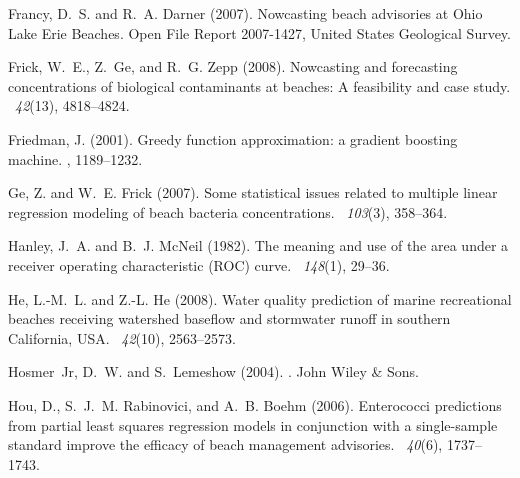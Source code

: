 \documentclass[authoryear,review, 12pt]{elsarticle}
\begin{document}
\begin{thebibliography}{}
Francy, D.~S. and R.~A. Darner (2007).
\newblock Nowcasting beach advisories at {Ohio Lake Erie Beaches}.
\newblock Open File Report 2007-1427, United States Geological Survey.

Frick, W.~E., Z.~Ge, and R.~G. Zepp (2008).
\newblock Nowcasting and forecasting concentrations of biological contaminants
  at beaches: A feasibility and case study.
~{\em 42\/}(13),
  4818--4824.

Friedman, J. (2001).
\newblock Greedy function approximation: a gradient boosting machine.
, 1189--1232.

Ge, Z. and W.~E. Frick (2007).
\newblock Some statistical issues related to multiple linear regression
  modeling of beach bacteria concentrations.
~{\em 103\/}(3), 358--364.

Hanley, J.~A. and B.~J. McNeil (1982).
\newblock The meaning and use of the area under a receiver operating
  characteristic ({ROC}) curve.
~{\em 148\/}(1), 29--36.

He, L.-M.~L. and Z.-L. He (2008).
\newblock Water quality prediction of marine recreational beaches receiving
  watershed baseflow and stormwater runoff in southern {C}alifornia, {USA}.
~{\em 42\/}(10), 2563--2573.

Hosmer~Jr, D.~W. and S.~Lemeshow (2004).
.
\newblock John Wiley \& Sons.

Hou, D., S.~J.~M. Rabinovici, and A.~B. Boehm (2006).
\newblock Enterococci predictions from partial least squares regression models
  in conjunction with a single-sample standard improve the efficacy of beach
  management advisories.
~{\em 40\/}(6),
  1737--1743.


\end{thebibliography}
\end{document}
